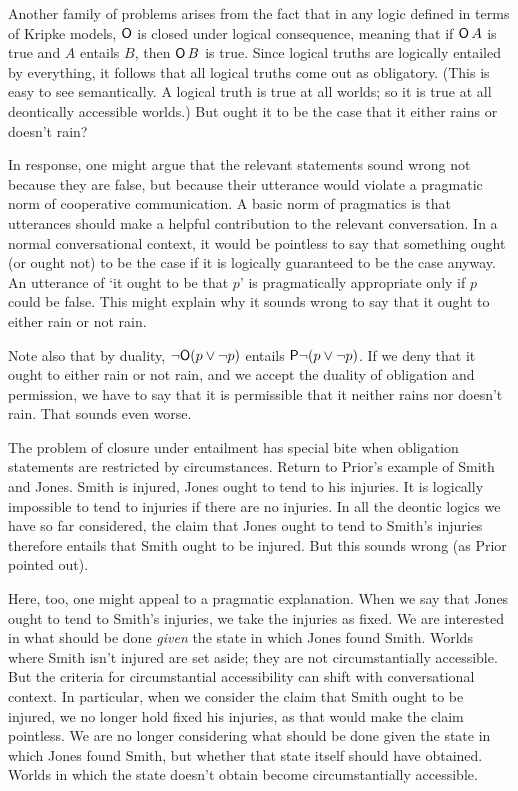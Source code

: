 
Another family of problems arises from the fact that in any logic defined in
terms of Kripke models, $\operatorname{\mathsf{O}}$ is closed under logical consequence, meaning that
if $\operatorname{\mathsf{O}} A$ is true and $A$ entails $B$, then $\operatorname{\mathsf{O}} B$ is true. Since logical
truths are logically entailed by everything, it follows that all logical truths
come out as obligatory. (This is easy to see semantically. A logical truth is
true at all worlds; so it is true at all deontically accessible worlds.) But ought it to be the case that it either rains or doesn't rain?

In response, one might argue that the relevant statements sound wrong not
because they are false, but because their utterance would violate a pragmatic
norm of cooperative communication. A basic norm of pragmatics is that utterances
should make a helpful contribution to the relevant conversation. In a normal
conversational context, it would be pointless to say that something ought (or
ought not) to be the case if it is logically guaranteed to be the case anyway.
An utterance of `it ought to be that $p$' is pragmatically appropriate only if
$p$ could be false. This might explain why it sounds wrong to say that it ought
to either rain or not rain.

Note also that by duality, $\neg\!\operatorname{\mathsf{O}}(p \lor \neg p)$ entails
$\operatorname{\mathsf{P}} \!\neg(p \lor \neg p)$. If we deny that it ought to either rain or not rain,
and we accept the duality of obligation and permission, we have to say that it
is permissible that it neither rains nor doesn't rain. That sounds even worse.

The problem of closure under entailment has special bite when obligation
statements are restricted by circumstances. Return to Prior's example of Smith
and Jones. Smith is injured, Jones ought to tend to his injuries. It is
logically impossible to tend to injuries if there are no injuries. In all the
deontic logics we have so far considered, the claim that Jones ought to tend to
Smith's injuries therefore entails that Smith ought to be injured. But this
sounds wrong (as Prior pointed out).

Here, too, one might appeal to a pragmatic explanation. When we say that Jones
ought to tend to Smith's injuries, we take the injuries as fixed. We are
interested in what should be done \emph{given} the state in which Jones found
Smith. Worlds where Smith isn't injured are set aside; they are not
circumstantially accessible. But the criteria for circumstantial accessibility
can shift with conversational context. In particular, when we consider the claim
that Smith ought to be injured, we no longer hold fixed his injuries, as that
would make the claim pointless. We are no longer considering what should be done
given the state in which Jones found Smith, but whether that state itself should
have obtained. Worlds in which the state doesn't obtain become circumstantially
accessible.

